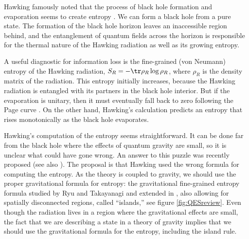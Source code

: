 
Hawking famously noted that the process of black hole formation and evaporation seems to create entropy \cite{Hawking:1976ra}. We can form a black hole from a pure state. The formation of the black hole horizon leaves an inaccessible region behind, and the entanglement of quantum fields across the horizon is responsible for the thermal nature of the Hawking radiation as well as its growing entropy. 

A useful diagnostic for information loss is the fine-grained (von Neumann) entropy of the Hawking radiation, $S_R = -\tr \rho_R \log \rho_R$, where $\rho_R$ is the density matrix of the radiation. This entropy initially increases, because the Hawking radiation is entangled with its partners in the black hole interior. But if the evaporation is unitary, then it must eventually fall back to zero following the Page curve \cite{Page:1993wv,Page:2013dx}.  On the other hand, Hawking's calculation predicts an entropy that rises monotonically as the black hole evaporates. 


Hawking's computation of the entropy seems straightforward. It can be done far from the black hole where the
effects of quantum gravity are small, so it is unclear what could have gone wrong. 
An answer to this puzzle was recently proposed \cite{Penington:2019npb,Almheiri:2019psf,Almheiri:2019hni}  (see also 
\cite{Mertens:2019bvy,Akers:2019wxj,Moitra:2019xoj,Almheiri:2019psy,Fu:2019oyc,Zhang:2019fcy,Akers:2019nfi,Almheiri:2019yqk,Rozali:2019day,Chen:2019uhq,Bousso:2019ykv,Jafferis:2019wkd,Blommaert:2019wfy}). The proposal is that Hawking used the wrong formula for computing the entropy. As the theory is coupled to gravity, we should use the proper gravitational formula for entropy: the gravitational fine-grained entropy formula studied by Ryu and Takayanagi \cite{Ryu:2006bv} and extended in \cite{Hubeny:2007xt,Faulkner:2013ana,Engelhardt:2014gca}, also allowing for 
spatially disconnected regions, called ``islands,'' see 
 figure \ref{fig:QESreview}.  Even though the radiation lives in a region where the gravitational effects are small, the fact that we are describing a state in a theory of gravity 
 implies that we should use the gravitational formula for the entropy, including the island rule. 
 


